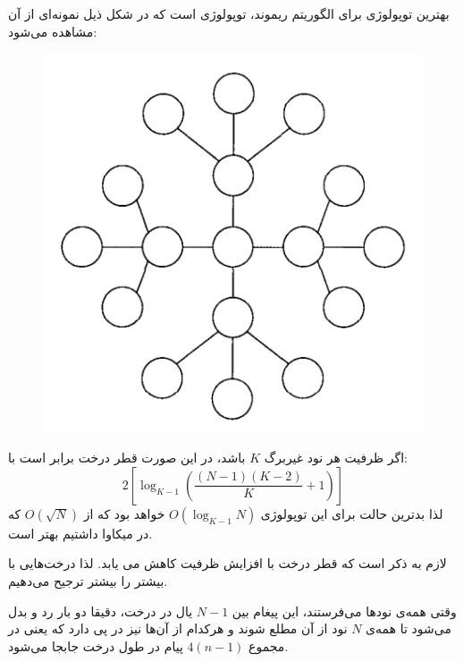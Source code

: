 \documentclass{article}
\begin{document}
\begin{multicols}{2}
\section{}
بهترین توپولوژی برای الگوریتم ریموند، توپولوژی
است که در شکل ذیل نمونه‌ای از آن مشاهده می‌شود:
\begin{figure}[H]
    \centering
    \includegraphics[width=0.50\linewidth]{Photos/HW7/radiatingStar.png}
    \caption{
    }
    \label{fig:my_label}
\end{figure}
اگر ظرفیت هر نود غیربرگ
$K$
باشد، در این صورت قطر درخت برابر است با:
$$2\left[ \log_{K-1}{\left(\frac{(N-1)(K-2)}{K}+1\right)} \right]$$
لذا بدترین حالت برای این توپولوژی
$O(\log_{K-1}{N})$
خواهد بود که از
$O(\sqrt{N})$
که در میکاوا داشتیم بهتر است.

لازم به ذکر است که قطر درخت با افزایش ظرفیت کاهش می یابد. لذا درخت‌هایی با
بیشتر را بیشتر ترجیح می‌دهیم.

وقتی همه‌ی نودها
می‌فرستند، این پیغام بین
$N-1$
یال در درخت، دقیقا دو بار رد و بدل می‌شود تا همه‌ی
$N$
نود از آن مطلع شوند و هرکدام از آن‌ها
نیز در پی دارد که یعنی در مجموع
$4(n-1)$
پیام در طول درخت جابجا می‌شود.


\end{multicols}
\end{document}
